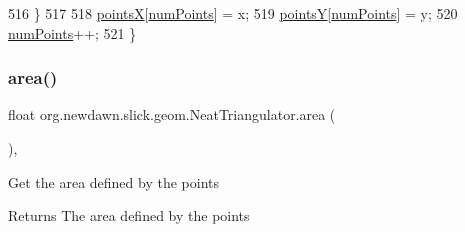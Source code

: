 \begin{DoxyCode}
516         \}
517         
518         \mbox{\hyperlink{classorg_1_1newdawn_1_1slick_1_1geom_1_1_neat_triangulator_a651e2f489c027306dacf8b03fb0f04a0}{pointsX}}[\mbox{\hyperlink{classorg_1_1newdawn_1_1slick_1_1geom_1_1_neat_triangulator_a24b4a230bc11d3c96dfe1de4dcb297f5}{numPoints}}] = x;
519         \mbox{\hyperlink{classorg_1_1newdawn_1_1slick_1_1geom_1_1_neat_triangulator_ac4491217b5be9c7a1ccbdb5511f832d9}{pointsY}}[\mbox{\hyperlink{classorg_1_1newdawn_1_1slick_1_1geom_1_1_neat_triangulator_a24b4a230bc11d3c96dfe1de4dcb297f5}{numPoints}}] = y;
520         \mbox{\hyperlink{classorg_1_1newdawn_1_1slick_1_1geom_1_1_neat_triangulator_a24b4a230bc11d3c96dfe1de4dcb297f5}{numPoints}}++;
521     \}
\end{DoxyCode}
\mbox{\label{classorg_1_1newdawn_1_1slick_1_1geom_1_1_neat_triangulator_ab9876be3379b56e71cce96d15fdd9044}} 
\subsubsection{\texorpdfstring{area()}{area()}}
{\footnotesize\ttfamily float org.\+newdawn.\+slick.\+geom.\+Neat\+Triangulator.\+area (\begin{DoxyParamCaption}{ }\end{DoxyParamCaption})\hspace{0.3cm}{\ttfamily [inline]}, {\ttfamily [private]}}

Get the area defined by the points

\begin{DoxyReturn}{Returns}
The area defined by the points 
\end{DoxyReturn}

